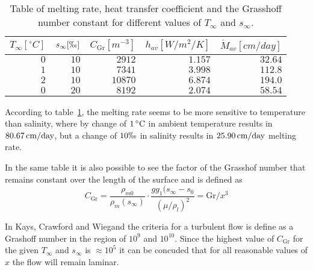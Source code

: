	\begin{table}
	  \centering
	  \begin{tabular}{rrrrr}
	    $T_\infty [\unit{^\circ C}]$ & $s_\infty [\permil]$ & $C_{\text{Gr}} [\unit{m^{-3}}]$ & $h_{av} [\unit{W/m^2/K}]$ & $\dot{M}_{av} [\unit{cm/day}]$ \\
	    \hline
	    $0$ & $10$ & $2912$ & $1.157$ & $32.64$ \\
	    $1$ & $10$ & $7341$ & $3.998$ & $112.8$ \\
	    $2$ & $10$ & $10870$ & $6.874$ & $194.0$ \\
	    $0$ & $20$ & $8192$ & $2.074$ & $58.54$ \\
	    \hline
	  \end{tabular}
	  \caption{Table of melting rate, heat transfer coefficient and the Grasshoff number constant for different values of $T_\infty$ and $s_\infty$.}
	  \label{tab:thermRes}
	\end{table}

	According to table~\ref{tab:thermRes}, the melting rate seems to be more sensitive to temperature than salinity, where by change of $ \unit[1]{^\circ C}$ in ambient temperature results in $\unit[80.67]{cm/day}$, but a change of $10 \permil$ in salinity results in $\unit[25.90]{cm/day}$ melting rate.

	In the same table it is also possible to see the factor of the Grasshof number that remains constant over the length of the surface and is defined as
	\begin{equation*}
	  C_{\text{Gr}}= \frac{\rho_{m0}}{\rho_{m}(s_{\infty})}\cdot \frac{g g_1 (s_{\infty}-s_0}{(\mu/\rho_l)^2} = \text{Gr}/x^3
	\end{equation*}

	In Kays, Crawford and Wiegand the criteria for a turbulent flow is define as a Grashoff number in the region of $10^9$ and $10^10$. Since the highest value of $C_{\text{Gr}}$ for the given $T_{\infty}$ and $s_{\infty}$ is $\approx 10^5$ it can be concuded that for all reasonable values of $x$ the flow will remain laminar.





